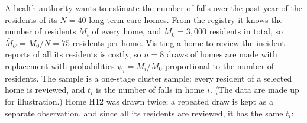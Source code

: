\documentclass[
  letterpaper,
  DIV=11,
  numbers=noendperiod]{scrreprt}
\renewcommand{\[}{\begin{equation}}
\renewcommand{\]}{\end{equation}}
\begin{document}
A health authority wants to estimate the number of falls over the past
year of the residents of its \(N=40\) long-term care homes. From the
registry it knows the number of residents \(M_i\) of every home, and
\(M_0=3{,}000\) residents in total, so \(\bar{M}_U=M_0/N=75\) residents
per home. Visiting a home to review the incident reports of all its
residents is costly, so \(n=8\) draws of homes are made with replacement
with probabilities \(\psi_i=M_i/M_0\) proportional to the number of
residents. The sample is a one-stage cluster sample: every resident of a
selected home is reviewed, and \(t_i\) is the number of falls in home
\(i\). (The data are made up for illustration.) Home H12 was drawn
twice; a repeated draw is kept as a separate observation, and since all
its residents are reviewed, it has the same \(t_i\):
\end{document}
